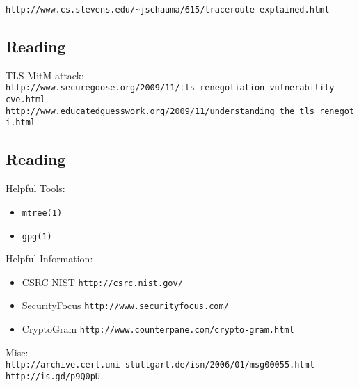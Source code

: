 \documentclass[xga]{xdvislides}
\begin{document}
\verb+http://www.cs.stevens.edu/~jschauma/615/traceroute-explained.html+

\subsection{Reading}
TLS MitM attack:
\\

\verb+http://www.securegoose.org/2009/11/tls-renegotiation-vulnerability-cve.html+ \\

\verb+http://www.educatedguesswork.org/2009/11/understanding_the_tls_renegoti.html+
\Normalsize

\subsection{Reading}
Helpful Tools:
\begin{itemize}
	\item \verb+mtree(1)+
	\item \verb+gpg(1)+
\end{itemize}
\addvspace{.5in}
Helpful Information:
\begin{itemize}
	\item CSRC NIST \verb+http://csrc.nist.gov/+
	\item SecurityFocus \verb+http://www.securityfocus.com/+
	\item CryptoGram \verb+http://www.counterpane.com/crypto-gram.html+
\end{itemize}
\addvspace{.5in}
Misc:
\\

\verb+http://archive.cert.uni-stuttgart.de/isn/2006/01/msg00055.html+
\\

\verb+http://is.gd/p9Q0pU+
\end{document}
